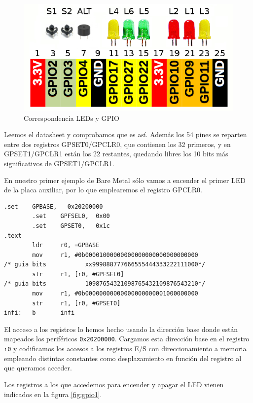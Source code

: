 \begin{figure}[h]
  \centering
    \includegraphics[width=14cm]{graphs/RaspberryGPIOaux.png}
  \caption{Correspondencia LEDs y GPIO}
  \label{fig:pinout}
\end{figure}

Leemos el datasheet y comprobamos que es así. Además los 54 pines se reparten entre dos
registros GPSET0/GPCLR0, que contienen los 32 primeros, y en GPSET1/GPCLR1 están los 22
restantes, quedando libres los 10 bits más significativos de GPSET1/GPCLR1.

En nuestro
primer ejemplo de Bare Metal sólo vamos a encender el primer LED de la placa auxiliar,
por lo que emplearemos el registro GPCLR0.

\begin{lstlisting}[caption={esbn2.s},label={lst:codigoPract4_2}]
        .set    GPBASE,   0x20200000
        .set    GPFSEL0,  0x00
        .set    GPSET0,   0x1c
.text
        ldr     r0, =GPBASE
        mov     r1, #0b00001000000000000000000000000000
/* guia bits           xx999888777666555444333222111000*/
        str     r1, [r0, #GPFSEL0]
/* guia bits           10987654321098765432109876543210*/
        mov     r1, #0b00000000000000000000001000000000
        str     r1, [r0, #GPSET0]
infi:   b       infi
\end{lstlisting}

El acceso a los registros lo hemos hecho usando la dirección base donde
están mapeados los periféricos {\tt 0x20200000}. Cargamos esta dirección
base en el registro {\tt r0} y codificamos los accesos a los registros
E/S con direccionamiento a memoria empleando distintas constantes como
desplazamiento en función del registro al que queramos acceder.

Los registros a los que accedemos para encender y apagar el LED vienen indicados
en la figura \ref{fig:gpio1}.

